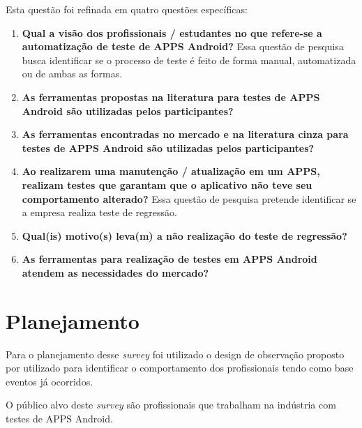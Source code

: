\vspace{.5em}

Esta questão foi refinada em quatro questões específicas:
\vspace{.5em}

\begin{enumerate}[label=\bf QP\arabic*,leftmargin=1.8cm]
    
    \item \textbf{Qual a visão dos profissionais / estudantes no que refere-se a automatização de teste de \ac{APPS} Android?} Essa questão de pesquisa busca identificar se o processo de teste é feito de forma manual, automatizada ou de ambas as formas.
    
    \item \textbf{As ferramentas propostas na literatura para testes de \ac{APPS} Android são utilizadas pelos participantes?}
    
    \item \textbf{As ferramentas encontradas no mercado e na literatura cinza para testes de \ac{APPS} Android são utilizadas pelos participantes?}
    

    \item \textbf{Ao realizarem uma manutenção / atualização em um \ac{APPS}, realizam testes que garantam que o aplicativo não teve seu comportamento alterado?} Essa questão de pesquisa pretende identificar se a empresa realiza teste de regressão.
    
    \item \textbf{Qual(is) motivo(s) leva(m) a não realização do teste de regressão?}
    
    \item \textbf{As ferramentas para realização de testes em \ac{APPS} Android atendem as necessidades do mercado?}
    
    
    
    
\end{enumerate}



\section{Planejamento}

Para o planejamento desse \textit{survey} foi utilizado o design de observação proposto por \cite{Kitchenham:2002:PSR:566493.566495} utilizado para identificar o comportamento dos profissionais tendo como base eventos já ocorridos.


O público alvo deste \textit{survey} são profissionais que trabalham na indústria com testes de \ac{APPS} Android.



